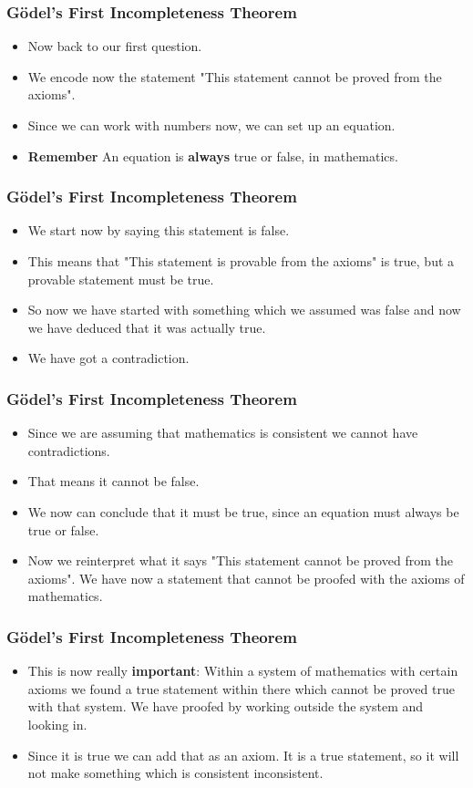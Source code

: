 \documentclass[aspectratio=169]{beamer}
\begin{document}
\begin{frame}
	\frametitle{Gödel's First Incompleteness Theorem}
	\begin{itemize}
		\item Now back to our first question.
		\item We encode now the statement "This statement cannot be proved from the axioms".
		\item Since we can work with numbers now, we can set up an equation.
		\item \textbf{Remember} An equation is \textbf{always} true or false, in mathematics.
	\end{itemize}
\end{frame}

\begin{frame}
	\frametitle{Gödel's First Incompleteness Theorem}
	\begin{itemize}
		\item We start now by saying this statement is false. 
		\item This means that "This statement is provable from the axioms" is true, but a provable statement must be true.
		\item So now we have started with something which we assumed was false and now we have deduced that it was actually true. 
		\item We have got a contradiction.
	\end{itemize}
\end{frame}

\begin{frame}
	\frametitle{Gödel's First Incompleteness Theorem}
	\begin{itemize}
		\item Since we are assuming that mathematics is consistent we cannot have contradictions.
		\item That means it cannot be false. 
		\item We now can conclude that it must be true, since an equation must always be true or false.
		\item Now we reinterpret what it says "This statement cannot be proved from the axioms". We have now a statement that cannot be proofed with the axioms of mathematics.
	\end{itemize}
\end{frame}

\begin{frame}
	\frametitle{Gödel's First Incompleteness Theorem}
	\begin{itemize}
		\item This is now really \textbf{important}: Within a system of mathematics with certain axioms we found a true statement within there which cannot be proved true with that system. We have proofed by working outside the system and looking in. \label{important}
		\item Since it is true we can add that as an axiom. It is a true statement, so it will not make something which is consistent inconsistent.
	\end{itemize}
\end{frame}
\end{document}
